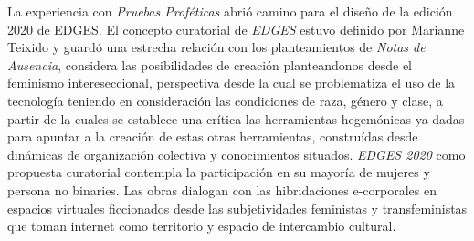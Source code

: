 La experiencia con \textit{Pruebas Proféticas} abrió camino para el diseño de la edición 2020 de EDGES. El concepto curatorial de \textit{EDGES} estuvo definido por Marianne Teixido y guardó una estrecha relación con los planteamientos de \textit{Notas de Ausencia}, considera las posibilidades de creación planteandonos desde el feminismo intereseccional, perspectiva desde la cual se problematiza el uso de la tecnología teniendo en consideración las condiciones de raza, género y clase, a partir de la cuales se establece una crítica las herramientas hegemónicas ya dadas para apuntar a la creación de estas otras herramientas, construídas desde dinámicas de organización colectiva y conocimientos situados. \textit{EDGES 2020} como propuesta curatorial contempla la participación en su mayoría de mujeres y persona no binaries. Las obras dialogan con las hibridaciones e-corporales en espacios virtuales ficcionados desde las subjetividades feministas y transfeministas que toman internet como territorio y espacio de intercambio cultural.

\iffalse
- Uso de espacios tridimensionales 
- Bots y literatura 
- Datos que transforman el espacio   
- Ensayos digitales en la web
- cyberfeminisimo
- audio virtualmente posicionado 
- streaming de audio y video sin plataformas privativas - decisiones de optimización
- Según yo aquí usamos icecast y liquid soap 
- Inicios de multiplayer
\fi
